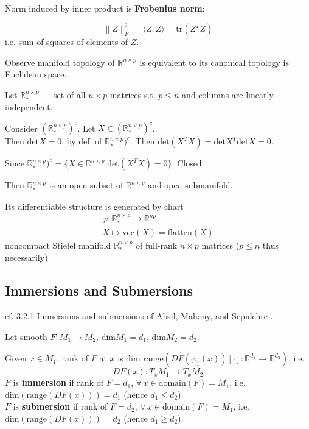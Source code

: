 \documentclass[10pt]{amsart}
\begin{document}
\begin{multicols*}{2}
Norm induced by inner product is \textbf{Frobenius norm}: 

\begin{equation}
\| Z \|_F^2 = \langle Z,Z\rangle = \text{tr}(Z^T Z)
\end{equation}
i.e. sum of squares of elements of $Z$.  

Observe manifold topology of $\mathbb{R}^{n\times p}$ is equivalent to its canonical topology is Euclidean space.  

Let $\mathbb{R}^{n\times p}_* \equiv $ set of all $n\times p$ matrices s.t. $p\leq n$ and columns are linearly independent.  

Consider $(\mathbb{R}_*^{n\times p})^c$.  Let $X \in (\mathbb{R}_*^{n\times p })^c$.  \\
Then $\text{det}X = 0$, by def. of $\mathbb{R}_*^{n\times p})^c$.  
Then $\text{det}(X^TX) =\text{det}X^T \text{det}X = 0$.  

Since $\mathbb{R}_*^{n\times p})^c = \lbrace X \in \mathbb{R}^{n\times p} | \text{det}(X^T X) = 0\rbrace$.  Closed.  

Then $\mathbb{R}^{n\times p}_* $ is an open subset of $\mathbb{R}^{n\times p}$ and open submanifold.  

Its differentiable structure is generated by chart 
\[
\begin{gathered}
	\varphi : \mathbb{R}^{n\times p}_*  \to \mathbb{R}^{np} \\
	X \mapsto \text{vec}(X) = \text{flatten}(X)
\end{gathered}
\]
noncompact Stiefel manifold $\mathbb{R}^{n\times p}_* $ of full-rank $n\times p $ matrices ($p\leq n $ thus necessarily)





\subsection{Immersions and Submersions}
 
cf. 3.2.1 Immersions and submersions of Absil, Mahony, and Sepulchre \cite{AMS2008}.    

Let smooth $F: M_1 \to M_2$, $\text{dim}M_1 = d_1$, $\text{dim}M_2 = d_2$.  

Given $x\in M_1$, $\text{rank}$ of $F$ at $x$ is $\text{dim} \text{ range}(D\widehat{F}(\varphi_1(x))[\cdot ] : \mathbb{R}^{d_1} \to \mathbb{R}^{d_2})$, i.e. 
\[
DF(x) : T_x M_1 \to T_xM_2
\]
$F$ is \textbf{immersion} if rank of $F = d_1$, $\forall \, x \in \text{domain}(F)= M_1$, i.e. $\text{dim}(\text{range}(DF(x))) = d_1$ (hence $d_1 \leq d_2$).  \\
$F$ is \textbf{submersion} if rank of $F = d_2$, $\forall \, x \in \text{domain}(F)= M_1$, i.e. $\text{dim}(\text{range}(DF(x))) = d_2$ (hence $d_1 \geq d_2$).  


\end{multicols*}
\end{document}
